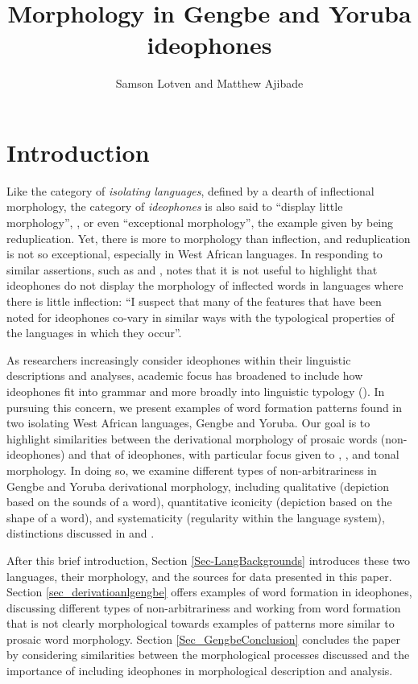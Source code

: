 \documentclass[output=paper,colorlinks,citecolor=brown]{langscibook}
\author{Samson Lotven\affiliation{Indiana University} 
and Matthew Ajibade\affiliation{Indiana University}}
\title{Morphology in Gengbe and Yoruba ideophones}
\begin{document}
\maketitle

\section{Introduction}
Like the category of \textit{isolating languages}, defined by a dearth of inflectional morphology, the category of \textit{ideophones} is also said to “display little morphology'', \citep[185]{Childs1994}, or even “exceptional morphology'', the example given by \citet[167]{Klamer2001} being reduplication. Yet, there is more to morphology than inflection, and reduplication is not so exceptional, especially in West African languages. In responding to similar assertions, such as \citet{Johnson1976} and \citet{Kunene1965}, \citet[26]{Ameka2001} notes that it is not useful to highlight that ideophones do not display the morphology of inflected words in languages where there is little inflection: “I suspect that many of the features that have been noted for ideophones co-vary in similar ways with the typological properties of the languages in which they occur''. 

\begin{sloppypar}
As researchers increasingly consider ideophones within their linguistic descriptions and analyses, academic focus has broadened to include how ideophones fit into grammar and more broadly into linguistic typology (\citealt{Newman2001, Voeltz_Killian-Hatz2001}). In pursuing this concern, we present examples of word formation patterns found in two isolating West African languages, Gengbe and Yoruba. Our goal is to highlight similarities between the derivational morphology of prosaic words (non-ideophones) and that of ideophones, with particular focus given to , , and tonal morphology. In doing so, we examine different types of non-arbitrariness in Gengbe and Yoruba derivational morphology, including qualitative  (depiction based on the sounds of a word), quantitative iconicity (depiction based on the shape of a word), and systematicity (regularity within the language system), distinctions discussed in \citet{CarlingandJohansson2015} and \citet{Dingemanseetal2015}. 
\end{sloppypar}

After this brief introduction, Section \ref{Sec-LangBackgrounds} introduces these two languages, their morphology, and the sources for data presented in this paper. Section \ref{sec_derivatioanlgengbe} offers examples of word formation in ideophones, discussing different types of non-arbitrariness and working from word formation that is not clearly morphological towards examples of patterns more similar to prosaic word morphology. Section \ref{Sec_GengbeConclusion} concludes the paper by considering similarities between the morphological processes discussed and the importance of including ideophones in morphological description and analysis.
 
\end{document}
